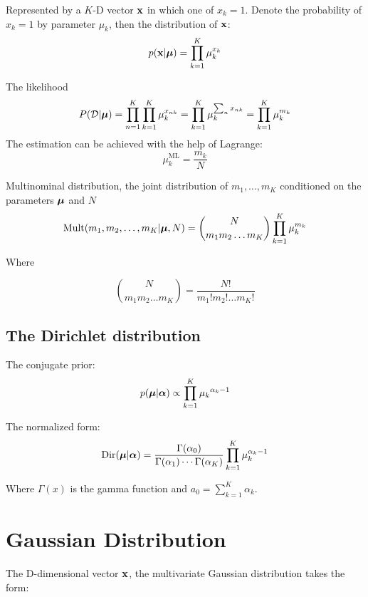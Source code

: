 Represented by a $K$-D vector $\mathbf{x}$ in which one of $x_k = 1$. Denote the
probability of $x_k = 1$ by parameter $\mu_k$, then the distribution of
$\mathbf{x}$:
\begin{equation}
    p(\mathbf{x}|\boldsymbol\mu) = \prod_{k=1}^K \mu_k^{x_k}
\end{equation}

The likelihood
\begin{equation}
    P(\mathcal{D}|\boldsymbol\mu) = \prod_{n=1}^K \prod_{k=1}^K \mu_k^{x_{nk}} =
    \prod_{k=1}^K \mu_k^{\sum_{n}x_{nk}} = \prod_{k=1}^K \mu_k^{m_k}
\end{equation}
The estimation can be achieved with the help of Lagrange:
\begin{equation}
    \mu_k^{\mbox{ML}} = \frac{m_k}{N}
\end{equation}

Multinominal distribution, the joint distribution of $m_1, \dots, m_K$
conditioned on the parameters $\boldsymbol\mu$ and $N$
\begin{equation}
    \mbox{Mult}(m_1,m_2, \dots, m_K|\boldsymbol\mu, N) = {N \choose m_1m_2\dots m_K}
    \prod_{k=1}^K \mu_k^{m_k}
    \label{multi-dist}
\end{equation}

Where 

\begin{equation}
    {N \choose m_1m_2\dots m_K} = \frac{N!}{m_1!m_2!\dots m_K!}
\end{equation}

\subsection{The Dirichlet distribution}
The conjugate prior:
\begin{equation}
    p(\boldsymbol\mu|\boldsymbol\alpha) \propto \prod_{k=1}^K {\mu_k}^{\alpha_k -1}
\end{equation}

The normalized form:
\begin{equation}
    \mbox{Dir}(\boldsymbol\mu|\boldsymbol\alpha) = \frac{\Gamma(\alpha_0)}{\Gamma(\alpha_1)
    \cdots \Gamma(\alpha_K)} \prod_{k=1}^K \mu_k^{\alpha_k -1}
\end{equation}

Where $\Gamma(x)$ is the gamma function and $a_0 = \sum_{k=1}^K \alpha_k$.

\section{Gaussian Distribution}
The D-dimensional vector $\mathbf{x}$, the multivariate Gaussian distribution
takes the form:

